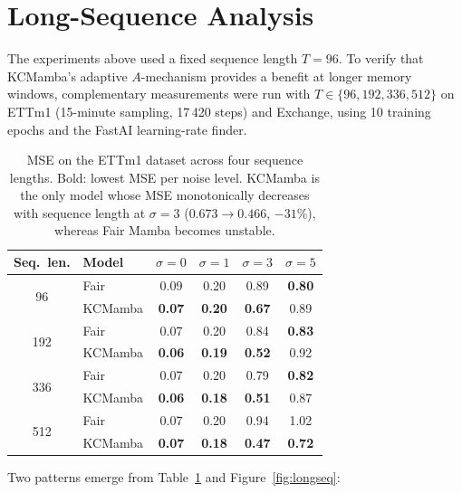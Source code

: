 \section{Long-Sequence Analysis}
\label{sec:longseq}

The experiments above used a fixed sequence length $T=96$.
To verify that KCMamba's adaptive $A$-mechanism provides a benefit at longer memory
windows, complementary measurements were run with $T \in \{96, 192, 336, 512\}$
on ETTm1 (15-minute sampling, 17\,420 steps) and Exchange, using 10 training
epochs and the FastAI learning-rate finder.

\begin{table}[H]
    \centering
    \small
    \begin{tabular}{|c|l|cccc|}
        \hline
        \textbf{Seq.\ len.} & \textbf{Model} &
        $\sigma=0$ & $\sigma=1$ & $\sigma=3$ & $\sigma=5$ \\
        \hline\hline
        \multirow{2}{*}{96}
            & Fair      & 0.09 & 0.20 & 0.89 & \textbf{0.80} \\
            & KCMamba       & \textbf{0.07} & \textbf{0.20} & \textbf{0.67} & 0.89 \\
        \hline
        \multirow{2}{*}{192}
            & Fair      & 0.07 & 0.20 & 0.84 & \textbf{0.83} \\
            & KCMamba       & \textbf{0.06} & \textbf{0.19} & \textbf{0.52} & 0.92 \\
        \hline
        \multirow{2}{*}{336}
            & Fair      & 0.07 & 0.20 & 0.79 & \textbf{0.82} \\
            & KCMamba       & \textbf{0.06} & \textbf{0.18} & \textbf{0.51} & 0.87 \\
        \hline
        \multirow{2}{*}{512}
            & Fair      & 0.07 & 0.20 & 0.94 & 1.02 \\
            & KCMamba       & \textbf{0.07} & \textbf{0.18} & \textbf{0.47} & \textbf{0.72} \\
        \hline
    \end{tabular}
    \caption{MSE on the ETTm1 dataset across four sequence lengths.
             Bold: lowest MSE per noise level.
             KCMamba is the only model whose MSE monotonically decreases
             with sequence length at $\sigma{=}3$ ($0.673 \to 0.466$, $-31\%$),
             whereas Fair Mamba becomes unstable.}
    \label{tab:longseq_ettm1}
\end{table}

Two patterns emerge from Table~\ref{tab:longseq_ettm1} and
Figure~\ref{fig:longseq}:

